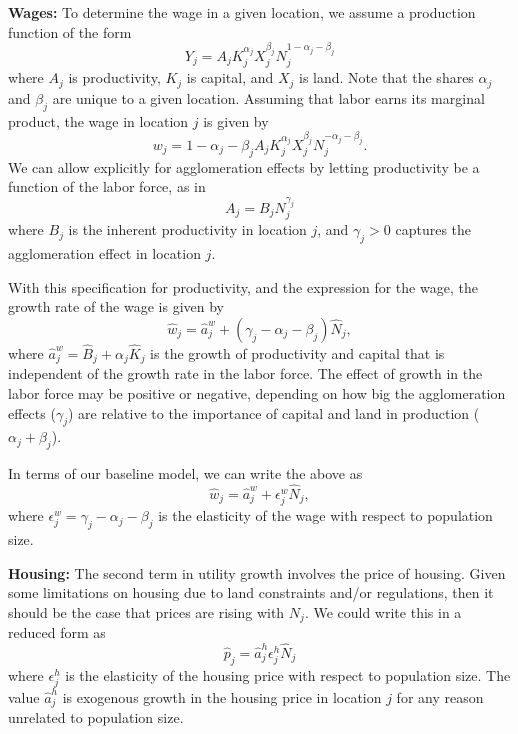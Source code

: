 \documentclass[10pt]{article}
\begin{document}
\textbf{Wages:} To determine the wage in a given location, we assume a production function of the form
\begin{equation}
    Y_j = A_j K_j^{\alpha_j} X_j^{\beta_j} N_j^{1 - \alpha_j - \beta_j}
\end{equation}
where $A_j$ is productivity, $K_j$ is capital, and $X_j$ is land. Note that the shares $\alpha_j$ and $\beta_j$ are unique to a given location. Assuming that labor earns its marginal product, the wage in location $j$ is given by
\begin{equation}
    w_j = {1 - \alpha_j - \beta_j} A_j K_j^{\alpha_j} X_j^{\beta_j} N_j^{- \alpha_j - \beta_j}.
\end{equation}
We can allow explicitly for agglomeration effects by letting productivity be a function of the labor force, as in
\begin{equation}
    A_j = B_j N_j^{\gamma_j}
\end{equation}
where $B_j$ is the inherent productivity in location $j$, and $\gamma_j>0$ captures the agglomeration effect in location $j$. 

With this specification for productivity, and the expression for the wage, the growth rate of the wage is given by
\begin{equation}
    \hat{w}_j = \hat{a}^w_j + (\gamma_j - \alpha_j - \beta_j)\hat{N}_j,
\end{equation}
where $\hat{a}^w_j = \hat{B}_j + \alpha_j \hat{K}_j$ is the growth of productivity and capital that is independent of the growth rate in the labor force. The effect of growth in the labor force may be positive or negative, depending on how big the agglomeration effects ($\gamma_j$) are relative to the importance of capital and land in production ($\alpha_j + \beta_j$).

In terms of our baseline model, we can write the above as
\begin{equation}
    \hat{w}_j = \hat{a}^w_j + \epsilon^w_j \hat{N}_j,
\end{equation}
where $\epsilon^w_j = \gamma_j - \alpha_j - \beta_j$ is the elasticity of the wage with respect to population size. 

\textbf{Housing:} The second term in utility growth involves the price of housing. Given some limitations on housing due to land constraints and/or regulations, then it should be the case that prices are rising with $N_j$. We could write this in a reduced form as
\begin{equation}
    \hat{p}_j = \hat{a}^h_j \epsilon_j^h \hat{N}_j
\end{equation}
where $\epsilon^h_j$ is the elasticity of the housing price with respect to population size. The value $\hat{a}^h_j$ is exogenous growth in the housing price in location $j$ for any reason unrelated to population size. 
\end{document}
